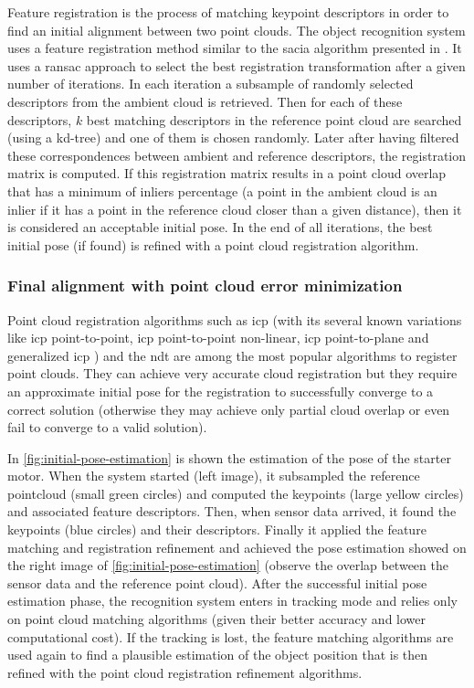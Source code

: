 Feature registration is the process of matching keypoint descriptors in order to find an initial alignment between two point clouds. The object recognition system uses a feature registration method similar to the \gls{sacia} algorithm presented in \cite{Rusu2009}. It uses a \gls{ransac} approach to select the best registration transformation after a given number of iterations. In each iteration a subsample of randomly selected descriptors from the ambient cloud is retrieved. Then for each of these descriptors, $k$ best matching descriptors in the reference point cloud are searched (using a kd-tree) and one of them is chosen randomly. Later after having filtered these correspondences between ambient and reference descriptors, the registration matrix is computed. If this registration matrix results in a point cloud overlap that has a minimum of inliers percentage (a point in the ambient cloud is an inlier if it has a point in the reference cloud closer than a given distance), then it is considered an acceptable initial pose. In the end of all iterations, the best initial pose (if found) is refined with a point cloud registration algorithm.


\subsubsection{Final alignment with point cloud error minimization}

Point cloud registration algorithms such as \gls{icp} \cite{Besl1992} (with its several known variations \cite{Rusinkiewicz2001,Pomerleau2013} like \gls{icp} point-to-point, \gls{icp} point-to-point non-linear, \gls{icp} point-to-plane and generalized \gls{icp} \cite{Segal2009}) and the \gls{ndt} \cite{Magnusson2009} are among the most popular algorithms to register point clouds. They can achieve very accurate cloud registration but they require an approximate initial pose for the registration to successfully converge to a correct solution (otherwise they may achieve only partial cloud overlap or even fail to converge to a valid solution).

In \cref{fig:initial-pose-estimation} is shown the estimation of the pose of the starter motor. When the system started (left image), it subsampled the reference pointcloud (small green circles) and computed the keypoints (large yellow circles) and associated feature descriptors. Then, when sensor data arrived, it found the keypoints (blue circles) and their descriptors. Finally it applied the feature matching and registration refinement and achieved the pose estimation showed on the right image of \cref{fig:initial-pose-estimation} (observe the overlap between the sensor data and the reference point cloud). After the successful initial pose estimation phase, the recognition system enters in tracking mode and relies only on point cloud matching algorithms (given their better accuracy and lower computational cost). If the tracking is lost, the feature matching algorithms are used again to find a plausible estimation of the object position that is then refined with the point cloud registration refinement algorithms.

